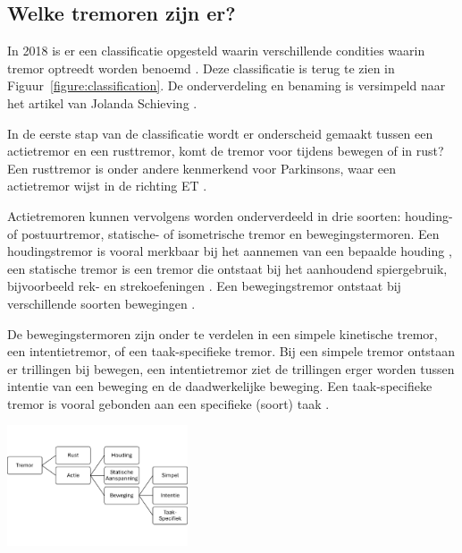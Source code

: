 \subsection{Welke tremoren zijn er?}

In 2018 is er een classificatie opgesteld waarin verschillende condities waarin tremor optreedt worden benoemd \cite{knf2022}.
Deze classificatie is terug te zien in Figuur~\ref{figure:classification}.
De onderverdeling en benaming is versimpeld naar het artikel van Jolanda Schieving \cite{schieving2023}.

In de eerste stap van de classificatie wordt er onderscheid gemaakt tussen een actietremor en een rusttremor,
komt de tremor voor tijdens bewegen of in rust? Een rusttremor is onder andere kenmerkend voor Parkinsons,
waar een actietremor wijst in de richting ET \cite{elsevier2022,sips2024}.

Actietremoren kunnen vervolgens worden onderverdeeld in drie soorten: houding- of postuurtremor,
statische- of isometrische tremor en bewegingstermoren.
Een houdingstremor is vooral merkbaar bij het aannemen van een bepaalde houding \cite{erasmus2022,elsevier2022}, 
een statische tremor is een tremor die ontstaat bij het aanhoudend spiergebruik, bijvoorbeeld rek- en strekoefeningen \cite{erasmus2022,nowak2013}.
Een bewegingstremor ontstaat bij verschillende soorten bewegingen \cite{elsevier2022}.

De bewegingstermoren zijn onder te verdelen in een simpele kinetische tremor, 
een intentietremor, of een taak-specifieke tremor. Bij een simpele tremor ontstaan er trillingen bij bewegen,
een intentietremor ziet de trillingen erger worden tussen intentie van een beweging en de daadwerkelijke beweging.
Een taak-specifieke tremor is vooral gebonden aan een specifieke (soort) taak \cite{erasmus2022}.

\begin{center}
    \includegraphics[width=0.4\textwidth]{./graphics/graph-tremor-classification.png}
    \label{figure:classification}
\end{center}

